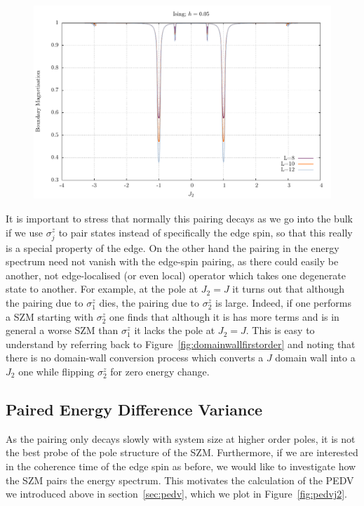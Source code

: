 \documentclass [a4paper, 11pt]{article}
\begin{document}
\begin{figure} [htbp]
\centering
 \includegraphics[width=\linewidth]{J2_mag.pdf}
\caption{}
\label{fig:bmj2}
\end{figure}

It is important to stress that normally this pairing decays as we go into the bulk if we use $\sigma^z_j$ to pair states instead of specifically the edge spin, so that this really is a special property of the edge. On the other hand the pairing in the energy spectrum need not vanish with the edge-spin pairing, as there could easily be another, not edge-localised (or even local) operator which takes one degenerate state to another. For example, at the pole at $J_2 = J$ it turns out that although the pairing due to $\sigma^z_1$ dies, the pairing due to $\sigma^z_2$ is large. Indeed, if one performs a SZM starting with $\sigma^z_2$ one finds that although it is has more terms and is in general a worse SZM than $\sigma^z_1$ it lacks the pole at $J_2 = J$. This is easy to understand by referring back to Figure~\ref{fig:domainwallfirstorder} and noting that there is no domain-wall conversion process which converts a $J$ domain wall into a $J_2$ one while flipping $\sigma^z_2$ for zero energy change. 

\subsection{Paired Energy Difference Variance}
 As the pairing only decays slowly with system size at higher order poles, it is not the best probe of the pole structure of the SZM. Furthermore, if we are interested in the coherence time of the edge spin as before, we would like to investigate how the SZM pairs the energy spectrum. This motivates the calculation of the PEDV we introduced above in section~\ref{sec:pedv}, which we plot in Figure~\ref{fig:pedvj2}.
\end{document}
